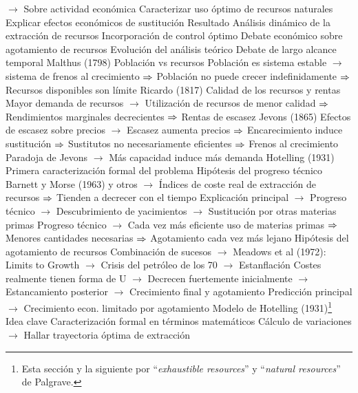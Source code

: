 \documentclass{nuevotema}
\begin{document}
\begin{esquemal}
				\4[] $\to$ Sobre actividad económica
				\4[] Caracterizar uso óptimo de recursos naturales
				\4[] Explicar efectos económicos de sustitución
				\4 Resultado
				\4[] Análisis dinámico de la extracción de recursos
				\4[] Incorporación de control óptimo
				\4[] Debate económico sobre agotamiento de recursos
			\3 Evolución del análisis teórico
				\4 Debate de largo alcance temporal
				\4 Malthus (1798)
				\4[] Población vs recursos
				\4[] Población es sistema estable
				\4[] $\to$ sistema de frenos al crecimiento
				\4[] $\Rightarrow$ Población no puede crecer indefinidamente
				\4[] $\Rightarrow$ Recursos disponibles son límite
				\4 Ricardo (1817)
				\4[] Calidad de los recursos y rentas
				\4[] Mayor demanda de recursos
				\4[] $\to$ Utilización de recursos de menor calidad
				\4[] $\Rightarrow$ Rendimientos marginales decrecientes
				\4[] $\Rightarrow$ Rentas de escasez
				\4 Jevons (1865)
				\4[] Efectos de escasez sobre precios
				\4[] $\to$ Escasez aumenta precios
				\4[] $\Rightarrow$ Encarecimiento induce sustitución
				\4[] $\Rightarrow$ Sustitutos no necesariamente eficientes
				\4[] $\Rightarrow$ Frenos al crecimiento
				\4[] Paradoja de Jevons
				\4[] $\to$ Más capacidad induce más demanda
				\4 Hotelling (1931)
				\4[] Primera caracterización formal del problema
				\4 Hipótesis del progreso técnico
				\4[] Barnett y Morse (1963) y otros
				\4[] $\to$ Índices de coste real de extracción de recursos
				\4[] $\Rightarrow$ Tienden a decrecer con el tiempo
				\4[] Explicación principal
				\4[] $\to$ Progreso técnico
				\4[] $\to$ Descubrimiento de yacimientos
				\4[] $\to$ Sustitución por otras materias primas
				\4[] Progreso técnico
				\4[] $\to$ Cada vez más eficiente uso de materias primas
				\4[] $\Rightarrow$ Menores cantidades necesarias
				\4[] $\Rightarrow$ Agotamiento cada vez más lejano
				\4 Hipótesis del agotamiento de recursos
				\4[] Combinación de sucesos
				\4[] $\to$ Meadows et al (1972): Limits to Growth
				\4[] $\to$ Crisis del petróleo de los 70
				\4[] $\to$ Estanflación
				\4[] Costes realmente tienen forma de U
				\4[] $\to$ Decrecen fuertemente inicialmente
				\4[] $\to$ Estancamiento posterior
				\4[] $\to$ Crecimiento final y agotamiento
				\4[] Predicción principal
				\4[] $\to$ Crecimiento econ. limitado por agotamiento
			\3 Modelo de Hotelling (1931)\footnote{Esta sección y la siguiente por ``\textit{exhaustible resources}'' y ``\textit{natural resources}'' de Palgrave.}
				\4 Idea clave
				\4[] Caracterización formal en términos matemáticos
				\4[] Cálculo de variaciones
				\4[] $\to$ Hallar trayectoria óptima de extracción

\end{esquemal}
\end{document}
